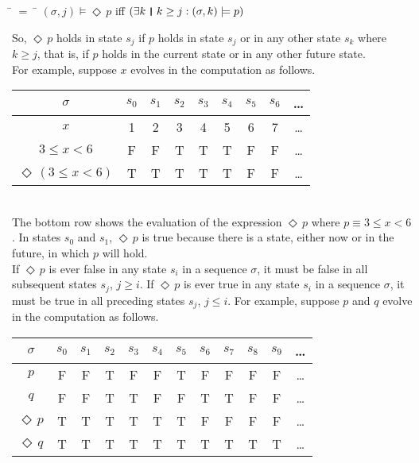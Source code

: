 \documentclass[fleqn, leqno]{article}
\newcommand{\mymathindent}{24pt} %
\newcommand{\Event}{\Diamond\,}
\newcommand{\thedr}{\rule[-.25ex]{.32mm}{1.75ex}} %
\newcommand{\dr}{\;\,\thedr\,\;} %
\newcommand{\rb}{:} %
\newcommand{\ext}{\exists} %
\begin{document}
\begin{tabbing}
\hspace{\mymathindent} \= $= \;$ \= \kill
\> $(\sigma, j) \models \Event p$ \quad iff \quad $(\ext k \dr k \ge j \rb (\sigma,k) \models p)$
\end{tabbing}

So, $\Event p$ holds in state $s_j$ if $p$ holds in state $s_j$ or in any other state $s_k$ where $k\ge j$,
that is, if $p$ holds in the current state or in any other future state.\\

For example, suppose $x$ evolves in the computation as follows.\\

\begin{tabular}{c|cccccccc}
$\sigma$ & $s_0$ & $s_1$ & $s_2$ & $s_3$ & $s_4$ & $s_5$ & $s_6$ & \dots \\
\hline
$x$ & 1 & 2 & 3 & 4 & 5 & 6 & 7 & \dots\\
$3\le x<6$ & F & F & T & T & T & F & F & \dots\\
$\Event(3\le x<6)$ & T & T & T & T & T & F & F & \dots\\
\end{tabular}\\

The bottom row shows the evaluation of the expression $\Event p$ where $p\equiv 3\le x<6$.
In states $s_0$ and $s_1$, $\Event p$ is true because there is a state, either now or in the future, in which $p$ will hold.\\

If $\Event p$ is ever false in any state $s_i$ in a sequence $\sigma$, it must be false in all subsequent states $s_j$, $j\ge i$.
If $\Event p$ is ever true in any state $s_i$ in a sequence $\sigma$, it must be true in all preceding states $s_j$, $j\le i$.
For example, suppose $p$ and $q$ evolve in the computation as follows.\\

\begin{tabular}{c|ccccccccccc}
$\sigma$ & $s_0$ & $s_1$ & $s_2$ & $s_3$ & $s_4$ & $s_5$ & $s_6$ & $s_7$ & $s_8$& $s_9$ & \dots \\
\hline
$p$ & F & F & T & F & F & T & F & F & F & F & \dots\\
$q$ & F & F & T & T & F & F & T & T & F & F & \dots\\
$\Event p$ & T & T & T & T & T & T & F & F & F & F & \dots\\
$\Event q$ & T & T & T & T & T & T & T & T & T & T & \dots\\
\end{tabular}\\
\end{document}
